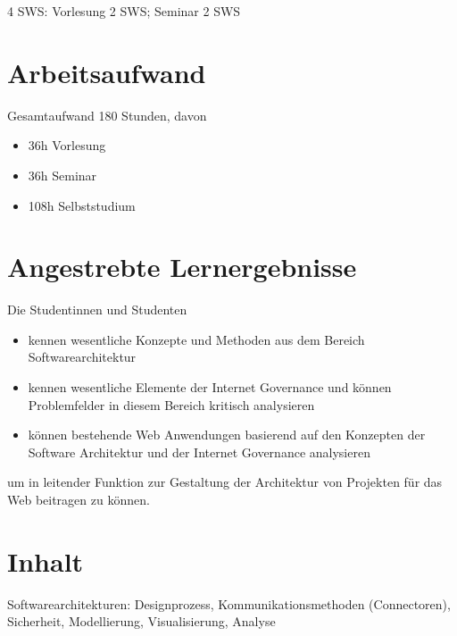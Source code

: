 4 SWS: Vorlesung 2 SWS; Seminar 2 SWS

\section*{Arbeitsaufwand\label{/mi-2017/modulbeschreibungen-master/MA_WTW_Modul_Web-Architekturen}}\label{arbeitsaufwandpathlabelmi-2017modulbeschreibungen-mastermaux5fwtwux5fmodulux5fweb-architekturen}

Gesamtaufwand 180 Stunden, davon

\begin{itemize}
\tightlist
\item
  36h Vorlesung
\item
  36h Seminar
\item
  108h Selbststudium
\end{itemize}

\section*{Angestrebte
Lernergebnisse\label{/mi-2017/modulbeschreibungen-master/MA_WTW_Modul_Web-Architekturen}}\label{angestrebte-lernergebnissepathlabelmi-2017modulbeschreibungen-mastermaux5fwtwux5fmodulux5fweb-architekturen}

Die Studentinnen und Studenten

\begin{itemize}
\tightlist
\item
  kennen wesentliche Konzepte und Methoden aus dem Bereich
  Softwarearchitektur
\item
  kennen wesentliche Elemente der Internet Governance und können
  Problemfelder in diesem Bereich kritisch analysieren
\item
  können bestehende Web Anwendungen basierend auf den Konzepten der
  Software Architektur und der Internet Governance analysieren
\end{itemize}

um in leitender Funktion zur Gestaltung der Architektur von Projekten
für das Web beitragen zu können.

\section*{Inhalt\label{/mi-2017/modulbeschreibungen-master/MA_WTW_Modul_Web-Architekturen}}\label{inhaltpathlabelmi-2017modulbeschreibungen-mastermaux5fwtwux5fmodulux5fweb-architekturen}

Softwarearchitekturen: Designprozess, Kommunikationsmethoden
(Connectoren), Sicherheit, Modellierung, Visualisierung, Analyse

